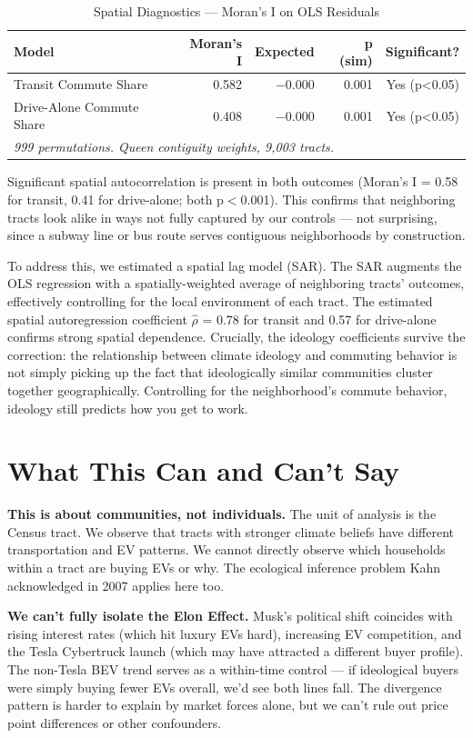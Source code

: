 \documentclass[12pt]{article}
\begin{document}
\begin{table}[H]
\centering
\caption{Spatial Diagnostics --- Moran's I on OLS Residuals}
\begin{tabular}{lrrrr}
\toprule
Model & Moran's I & Expected & p (sim) & Significant? \\
\midrule
Transit Commute Share     & 0.582 & $-$0.000 & 0.001 & Yes (p<0.05) \\
Drive-Alone Commute Share & 0.408 & $-$0.000 & 0.001 & Yes (p<0.05) \\
\bottomrule
\multicolumn{5}{l}{\footnotesize \textit{999 permutations. Queen contiguity weights, 9,003 tracts.}} \\
\end{tabular}
\end{table}

Significant spatial autocorrelation is present in both outcomes (Moran's I = 0.58 for
transit, 0.41 for drive-alone; both p$<$0.001). This confirms that neighboring tracts
look alike in ways not fully captured by our controls --- not surprising, since a subway
line or bus route serves contiguous neighborhoods by construction.

To address this, we estimated a spatial lag model (SAR). The SAR augments the OLS
regression with a spatially-weighted average of neighboring tracts' outcomes, effectively
controlling for the local environment of each tract. The estimated spatial autoregression
coefficient $\hat{\rho}$ = 0.78 for transit and 0.57 for drive-alone confirms strong
spatial dependence. Crucially, the ideology coefficients survive the correction: the
relationship between climate ideology and commuting behavior is not simply picking up
the fact that ideologically similar communities cluster together geographically.
Controlling for the neighborhood's commute behavior, ideology still predicts how you
get to work.

\section{What This Can and Can't Say}

\textbf{This is about communities, not individuals.} The unit of analysis is the Census tract.
We observe that tracts with stronger climate beliefs have different transportation and EV
patterns. We cannot directly observe which households within a tract are buying EVs or why.
The ecological inference problem Kahn acknowledged in 2007 applies here too.

\textbf{We can't fully isolate the Elon Effect.} Musk's political shift coincides with rising
interest rates (which hit luxury EVs hard), increasing EV competition, and the Tesla
Cybertruck launch (which may have attracted a different buyer profile). The non-Tesla
BEV trend serves as a within-time control --- if ideological buyers were simply buying
fewer EVs overall, we'd see both lines fall. The divergence pattern is harder to explain
by market forces alone, but we can't rule out price point differences or other confounders.
\end{document}
